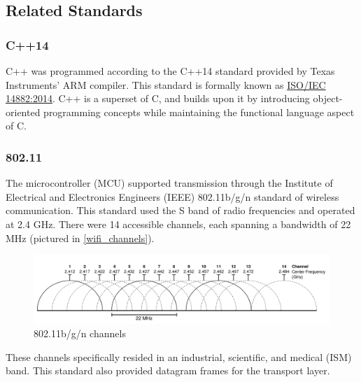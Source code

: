 \subsection{Related Standards}
\subsubsection{C++14} 
C++ was programmed according to the C++14 standard provided by Texas Instruments' ARM compiler. This standard is formally known as \href{https://www.iso.org/standard/64029.html}{ISO/IEC 14882:2014}. C++ is a superset of C, and builds upon it by introducing object-oriented programming concepts while maintaining the functional language aspect of C.
\subsubsection{802.11} 
The microcontroller (MCU) supported transmission through the Institute of Electrical and Electronics Engineers (IEEE) 802.11b/g/n standard of wireless communication. This standard used the S band of radio frequencies and operated at 2.4 GHz. There were 14 accessible channels, each spanning a bandwidth of 22 MHz (pictured in \autoref{wifi_channels}).
\begin{figure}[H]
    \caption{802.11b/g/n channels \cite{Flickenger}}
    \label{wifi_channels}
    \centering
    \includegraphics[width=\textwidth]{images/wifi_channels.png}
\end{figure}
These channels specifically resided in an industrial, scientific, and medical (ISM) band. This standard also provided datagram frames for the transport layer.

